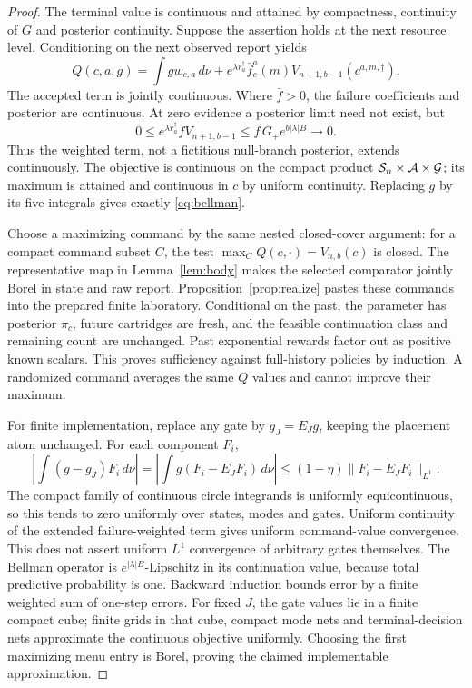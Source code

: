 \begin{proof}
The terminal value is continuous and attained by compactness, continuity of $G$ and posterior continuity. Suppose the assertion holds at the next resource level. Conditioning on the next observed report yields
\[
 Q(c,a,g)=\int gw_{c,a}\,d\nu+
 e^{\lambda r_a^\dagger}\bar f_c^a(m)V_{n+1,b-1}(c^{a,m,\dagger}).
\]
The accepted term is jointly continuous. Where $\bar f>0$, the failure coefficients and posterior are continuous. At zero evidence a posterior limit need not exist, but
\[
 0\le e^{\lambda r_a^\dagger}\bar f V_{n+1,b-1}
 \le \bar f\,G_+e^{b|\lambda|B}\longrightarrow0.
\]
Thus the weighted term, not a fictitious null-branch posterior, extends continuously. The objective is continuous on the compact product $\mathcal S_n\times\mathcal A\times\mathcal G$; its maximum is attained and continuous in $c$ by uniform continuity. Replacing $g$ by its five integrals gives exactly \eqref{eq:bellman}.

Choose a maximizing command by the same nested closed-cover argument: for a compact command subset $C$, the test $\max_C Q(c,\cdot)=V_{n,b}(c)$ is closed. The representative map in Lemma~\ref{lem:body} makes the selected comparator jointly Borel in state and raw report. Proposition~\ref{prop:realize} pastes these commands into the prepared finite laboratory. Conditional on the past, the parameter has posterior $\pi_c$, future cartridges are fresh, and the feasible continuation class and remaining count are unchanged. Past exponential rewards factor out as positive known scalars. This proves sufficiency against full-history policies by induction. A randomized command averages the same $Q$ values and cannot improve their maximum.

For finite implementation, replace any gate by $g_J=E_Jg$, keeping the placement atom unchanged. For each component $F_i$,
\[
 \left|\int(g-g_J)F_i\,d\nu\right|
 =\left|\int g(F_i-E_JF_i)\,d\nu\right|
 \le(1-\eta)\|F_i-E_JF_i\|_{L^1}.
\]
The compact family of continuous circle integrands is uniformly equicontinuous, so this tends to zero uniformly over states, modes and gates. Uniform continuity of the extended failure-weighted term gives uniform command-value convergence. This does not assert uniform $L^1$ convergence of arbitrary gates themselves. The Bellman operator is $e^{|\lambda|B}$-Lipschitz in its continuation value, because total predictive probability is one. Backward induction bounds error by a finite weighted sum of one-step errors. For fixed $J$, the gate values lie in a finite compact cube; finite grids in that cube, compact mode nets and terminal-decision nets approximate the continuous objective uniformly. Choosing the first maximizing menu entry is Borel, proving the claimed implementable approximation.
\end{proof}

